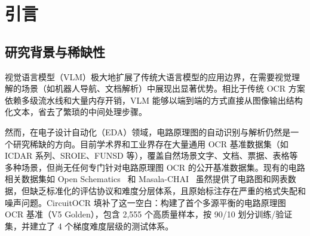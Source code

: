 
\maketitle

\begin{abstract}
电路原理图自动识别是电子设计自动化（EDA）领域的一项核心挑战，涉及视觉文字提取与拓扑图论追踪两大异构任务。本文提出 CircuitOCR，一个基于 PaddleOCR-VL-0.9B 的电路原理图 OCR 与网表提取系统。我们构建了 V5 Golden 多源平衡数据集，包含 1,857 张 KiCad 原理图（500 张程序化合成渲染图 + 1,357 张真实开源项目图）与 698 张 Masala-CHAI 教材电路图，经 SPICE 伪影清洗、质量评分和分层采样后保留 2,555 个独立样本，按 90/10 划分为训练集（2,299）和验证集（256）。我们通过系统性 LoRA 消融实验识别出\textbf{模态塌缩的根因}——对视觉-语言投影层（Projector）的微调会破坏预训练对齐权重——并提出 LLM-Only LoRA 架构彻底解决了该问题。最终 V8-Fixed 模型采用宽 LoRA 配置（$r=16$, $\alpha=32$, 5.7M 可训练参数），通过修复因果 token 偏移和 BPE 边界合并两大关键问题，在 V5 Golden 数据集上训练 3 epoch（1,800 步）后，于 easy100 全量测试集取得 Avg. NED = 0.7760（基座 0.9372，相对错误率削减 17.2\%），easy50 验证集取得 0.8257（基座 0.9634，相对错误率削减 14.3\%）。训练在单卡 NVIDIA RTX 4060 笔记本 GPU（8GB 显存）上约 2 小时完成。模型权重、数据集和在线 Demo 均已开源发布。
\end{abstract}



\section{引言}

\subsection{研究背景与稀缺性}

视觉语言模型（VLM）极大地扩展了传统大语言模型的应用边界，在需要视觉理解的场景（如机器人导航、文档解析）中展现出显著优势。相比于传统 OCR 方案依赖多级流水线和大量内存开销，VLM 能够以端到端的方式直接从图像输出结构化文本，省去了繁琐的中间处理步骤。

然而，在电子设计自动化（EDA）领域，电路原理图的自动识别与解析仍然是一个研究稀缺的方向。目前学术界和工业界存在大量通用 OCR 基准数据集（如 ICDAR 系列、SROIE、FUNSD 等），覆盖自然场景文字、文档、票据、表格等多种场景，但尚无任何专门针对电路原理图 OCR 的公开基准数据集。现有的电路相关数据集如 Open Schematics~\citep{openschematics2025} 和 Masala-CHAI~\citep{bhandari2025masalachai} 虽然提供了电路图和网表数据，但缺乏标准化的评估协议和难度分层体系，且原始标注存在严重的格式失配和噪声问题。CircuitOCR 填补了这一空白：构建了首个多源平衡的电路原理图 OCR 基准（V5 Golden），包含 2,555 个高质量样本，按 90/10 划分训练/验证集，并建立了 4 个梯度难度层级的测试体系。


